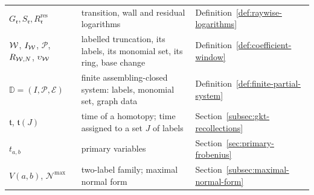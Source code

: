 \begin{xltabular}{\textwidth}{@{}p{0.27\textwidth}X p{0.19\textwidth}@{}}
$G_{\mathfrak r},S_{\mathfrak r},R^{\mathrm{res}}_{\mathfrak r}$ & transition, wall and
residual logarithms & Definition~\ref{def:raywise-logarithms}\\
$\mathcal W$, $I_\mathcal W$, $\mathscr P$, $R_{\mathcal W,N}$, $\upsilon_\mathcal W$ &
labelled truncation, its labels, its monomial set, its ring, base change &
Definition~\ref{def:coefficient-window}\\
$\mathbb D=(I,\mathscr P,\mathcal E)$ & finite assembling-closed system:
labels, monomial set, graph data & Definition~\ref{def:finite-partial-system}\\
$\mathfrak t$, $\mathfrak t(J)$ & time of a homotopy; time assigned to a set
$J$ of labels & Section~\ref{subsec:gkt-recollections}\\
$t_{a,b}$ & primary variables & Section~\ref{sec:primary-frobenius}\\
$V(a,b)$, $\mathcal N^{\max}$ & two-label family; maximal normal form &
Section~\ref{subsec:maximal-normal-form}\\
\end{xltabular}
